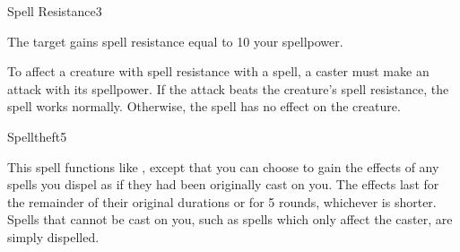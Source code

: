 \begin{spellsection}{Spell Resistance}{3}
    \begin{spellheader}
    \end{spellheader}
    \begin{spellcontent}
        \begin{spelltargetinginfo}
        \end{spelltargetinginfo}
        \begin{spelleffects}
            \spelleffect The target gains spell resistance equal to 10 \add your spellpower.
            \spelldur \durshort
        \end{spelleffects}
    \end{spellcontent}
    \begin{spellfooter}
        \spellnotes To affect a creature with spell resistance with a spell, a caster must make an attack with its spellpower. If the attack beats the creature's spell resistance, the spell works normally. Otherwise, the spell has no effect on the creature.
        \miscastrandom
    \end{spellfooter}
\end{spellsection}

\begin{spellsection}{Spelltheft}{5}
    \begin{spellheader}
    \end{spellheader}
    \begin{spellcontent}
        \spellspecial This spell functions like , except that you can choose to gain the effects of any spells you dispel as if they had been originally cast on you. The effects last for the remainder of their original durations or for 5 rounds, whichever is shorter. Spells that cannot be cast on you, such as spells which only affect the caster, are simply dispelled.
    \end{spellcontent}
    \begin{spellfooter}
        \miscastrandom
    \end{spellfooter}
\end{spellsection}

